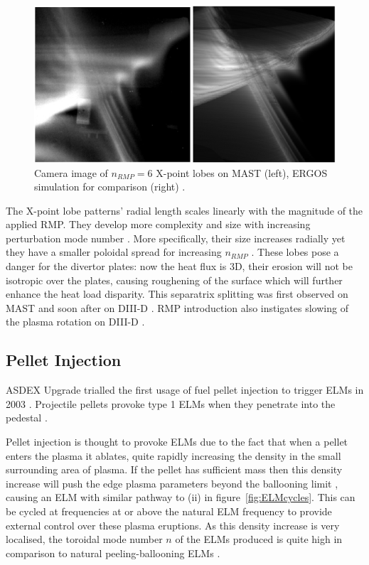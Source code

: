 \documentclass[11pt, twocolumn]{article}  %
\begin{document}
\begin{figure}
\includegraphics[scale=0.5]{Figures/lobes.PNG}
\centering
\caption{Camera image of $n_{RMP}=6$ X-point lobes on MAST (left), ERGOS simulation for comparison (right) \cite{Harrison2014}.}\label{fig:lobes}
\end{figure}

The X-point lobe patterns' radial length scales linearly with the magnitude of the applied RMP. They develop more complexity and size with increasing perturbation mode number \cite{Harrison2014}. More specifically, their size increases radially yet they have a smaller poloidal spread for increasing $n_{RMP}$ \cite{Chapman2014}. These lobes pose a danger for the divertor plates: now the heat flux is 3D, their erosion will not be isotropic over the plates, causing roughening of the surface which will further enhance the heat load disparity. This separatrix splitting was first observed on MAST \cite{Kirk2012} and soon after on DIII-D \cite{Shafer2012}. RMP introduction also instigates slowing of the plasma rotation on DIII-D \cite{Kirk2013}.

\subsection{Pellet Injection}\label{ssec:PInjection}
ASDEX Upgrade trialled the first usage of fuel pellet injection to trigger ELMs in 2003 \cite{Lang2003}. Projectile pellets provoke type 1 ELMs when they penetrate into the pedestal \cite{KirkFF}. 

Pellet injection is thought to provoke ELMs due to the fact that when a pellet enters the plasma it ablates, quite rapidly increasing the density in the small surrounding area of plasma. If the pellet has sufficient mass then this density increase will push the edge plasma parameters beyond the ballooning limit \cite{Baylor2015}, causing an ELM with similar pathway to (ii) in figure~\ref{fig:ELMcycles}. This can be cycled at frequencies at or above the natural ELM frequency to provide external control over these plasma eruptions. As this density increase is very localised, the toroidal mode number $n$ of the ELMs produced is quite high in comparison to natural peeling-ballooning ELMs \cite{Baylor2015}.
\end{document}
